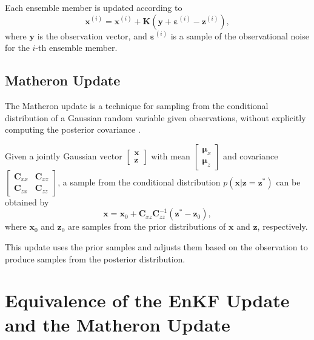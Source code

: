 \documentclass{article}
\begin{document}
Each ensemble member is updated according to
\begin{equation}
    \mathbf{x}^{(i)} = \mathbf{x}^{(i)} + \mathbf{K} \left( \mathbf{y} + \boldsymbol{\varepsilon}^{(i)} - \mathbf{z}^{(i)} \right),
    \label{eq:enkf_update}
\end{equation}
where $\mathbf{y}$ is the observation vector, and $\boldsymbol{\varepsilon}^{(i)}$ is a sample of the observational noise for the $i$-th ensemble member.

\subsection{Matheron Update}

The Matheron update is a technique for sampling from the conditional distribution of a Gaussian random variable given observations, without explicitly computing the posterior covariance \citep{Doucet2010Note,Wilson2020Efficiently,Wilson2021Pathwise}.

Given a jointly Gaussian vector $\begin{bmatrix} \mathbf{x} \\ \mathbf{z} \end{bmatrix}$ with mean $\begin{bmatrix} \boldsymbol{\mu}_x \\ \boldsymbol{\mu}_z \end{bmatrix}$ and covariance $\begin{bmatrix} \mathbf{C}_{xx} & \mathbf{C}_{xz} \\ \mathbf{C}_{zx} & \mathbf{C}_{zz} \end{bmatrix}$, a sample from the conditional distribution $p(\mathbf{x} | \mathbf{z} = \mathbf{z}^*)$ can be obtained by
\begin{equation}
    \mathbf{x} = \mathbf{x}_0 + \mathbf{C}_{xz} \mathbf{C}_{zz}^{-1} \left( \mathbf{z}^* - \mathbf{z}_0 \right),
    \label{eq:matheron_update}
\end{equation}
where $\mathbf{x}_0$ and $\mathbf{z}_0$ are samples from the prior distributions of $\mathbf{x}$ and $\mathbf{z}$, respectively.

This update uses the prior samples and adjusts them based on the observation to produce samples from the posterior distribution.

\section{Equivalence of the EnKF Update and the Matheron Update}
\end{document}
